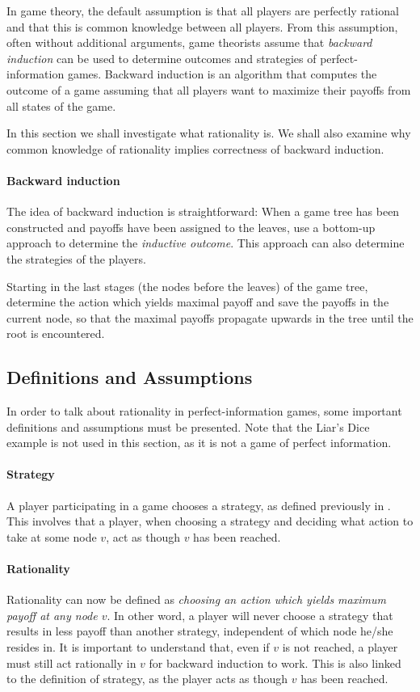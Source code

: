 In game theory, the default assumption is that all players are perfectly rational and that this is common knowledge between all players. From this assumption, often without additional arguments, game theorists assume that \emph{backward induction} can be used to determine outcomes and strategies of perfect-information games. Backward induction is an algorithm that computes the outcome of a game assuming that all players want to maximize their payoffs from all states of the game.

In this section we shall investigate what rationality is. We shall also examine why common knowledge of rationality implies correctness of backward induction.

\paragraph*{Backward induction}
The idea of backward induction is straightforward: When a game tree has been constructed and payoffs have been assigned to the leaves, use a bottom-up approach to determine the \emph{inductive outcome}. This approach can also determine the strategies of the players. 

Starting in the last stages (the nodes before the leaves) of the game tree, determine the action which yields maximal payoff and save the payoffs in the current node, so that the maximal payoffs propagate upwards in the tree until the root is encountered.

\subsection{Definitions and Assumptions}
In order to talk about rationality in perfect-information games, some important definitions and assumptions must be presented. Note that the Liar's Dice example is not used in this section, as it is not a game of perfect information.

\paragraph*{Strategy} A player participating in a game chooses a strategy, as defined previously in . This involves that a player, when choosing a strategy and deciding what action to take at some node $v$, act as though $v$ has been reached.

\paragraph*{Rationality} Rationality can now be defined as \textit{choosing an action which yields maximum payoff at any node $v$}. In other word, a player will never choose a strategy that results in less payoff than another strategy, independent of which node he/she resides in. 
It is important to understand that, even if $v$ is not reached, a player must still act rationally in $v$ for backward induction to work. This is also linked to the definition of strategy, as the player acts as though $v$ has been reached.

